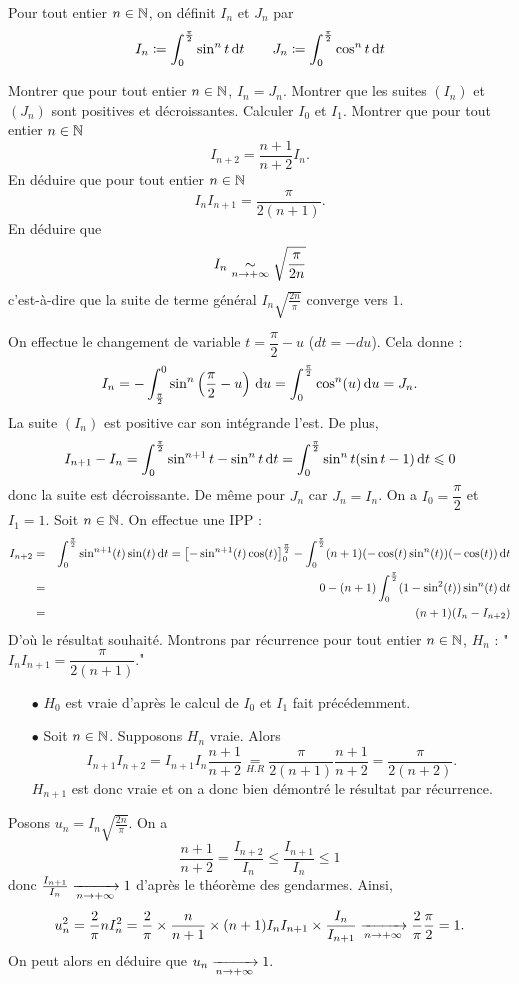 \documentclass{magnolia}
\begin{document}
Pour tout entier $n\in\mathbb{N}$, on définit $I_n$ et $J_n$ par
\[I_n\coloneqq\int_{0}^{\frac{\pi}{2}} \sin^n t\,\text{d}t \qquad
  J_n\coloneqq\int_{0}^{\frac{\pi}{2}} \cos^n t\,\text{d}t\]
\begin{questions}
\question Montrer que pour tout entier $n\in\mathbb{N}$, $I_n=J_n$.
\question Montrer que les suites $(I_n)$ et $(J_n)$ sont positives et
  décroissantes. Calculer $I_0$ et $I_1$.
\question Montrer que pour tout entier $n\in\mathbb{N}$
  \[I_{n+2}=\frac{n+1}{n+2}I_n.\]
\question En déduire que pour tout entier $n\in\mathbb{N}$
  \[I_n I_{n+1}=\frac{\pi}{2(n+1)}.\]
\question En déduire que
  \[I_n\underset{n\rightarrow+\infty}{\sim}\sqrt{\frac{\pi}{2n}}\]
  c'est-à-dire que la suite de terme général $I_n\sqrt{\frac{2n}{\pi}}$
  converge vers $1$.
\end{questions}
\begin{sol}
\begin{questions}
\question On effectue le changement de variable $t=\dfrac{\pi}{2}-u$ ($dt=-du$). Cela donne :
$$I_n=-\int_{\frac{\pi}{2}}^{0} \sin^n \left(\dfrac{\pi}{2}-u\right)\,\text{d}u=\int_{0}^{\frac{\pi}{2}} \cos^n (u)\,\text{d}u=J_n.$$
\question La suite $(I_n)$ est positive car son intégrande l'est. De plus,
$$I_{n+1}-I_n=\int_{0}^{\frac{\pi}{2}} \sin^{n+1} t-\sin^n t\,\text{d}t=\int_{0}^{\frac{\pi}{2}} \sin^{n} t(\sin t-1)\,\text{d}t\leqslant 0$$ donc la suite est décroissante. De même pour $J_n$ car $J_n=I_n$.
 On a $I_0=\dfrac{\pi}{2}$ et $I_1=1$.
\question Soit $n\in\mathbb{N}$. On effectue une IPP :
\begin{eqnarray*}
I_{n+2}&=&\int_{0}^{\frac{\pi}{2}} \sin^{n+1} (t)\sin (t)\,\text{d}t=\left[-\sin^{n+1} (t) \cos (t)\right]_0^{\frac{\pi}{2}}-\int_{0}^{\frac{\pi}{2}} (n+1)(-\cos (t) \sin^n (t))(-\cos(t))\,\text{d}t\\
&=&0-(n+1)\int_{0}^{\frac{\pi}{2}} (1-\sin^2(t))\sin^n(t)\,\text{d}t\\
&=&(n+1)(I_n-I_{n+2})
\end{eqnarray*}
D'où le résultat souhaité.
\question Montrons par récurrence pour tout entier $n\in\mathbb{N}$, $H_n$ : "$I_n I_{n+1}=\dfrac{\pi}{2(n+1)}.$"
\begin{itemize}
\item [$\bullet$] $H_0$ est vraie d'après le calcul de $I_0$ et $I_1$ fait précédemment.
\item [$\bullet$] Soit $n\in \mathbb{N}$. Supposons $H_n$ vraie. Alors $$I_{n+1}I_{n+2}=I_{n+1}I_n\frac{n+1}{n+2}\underset{H.R}{=}\frac{\pi}{2(n+1)}\frac{n+1}{n+2}=\frac{\pi}{2(n+2)}.$$ $H_{n+1}$ est donc vraie et on a donc bien démontré le résultat par récurrence.
\end{itemize}
\question Posons $u_n=I_n\sqrt{\frac{2n}{\pi}}$. On a
$$\frac{n+1}{n+2}=\frac{I_{n+2}}{I_n}\leq \frac{I_{n+1}}{I_n}\leq 1 $$ donc $\frac{I_{n+1}}{I_n} \xrightarrow[n\rightarrow +\infty]{}{1}$ d'après le théorème des gendarmes.
Ainsi, $$u_n^2=\frac{2}{\pi}n I_n^2=\frac{2}{\pi}\times\frac{n}{n+1}\times (n+1)I_n I_{n+1}\times \frac{I_n}{I_{n+1}}\xrightarrow[n\rightarrow +\infty]{}{\frac{2}{\pi}\frac{\pi}{2}}=1.$$
On peut alors en déduire que $u_n \xrightarrow[n\rightarrow +\infty]{}{1}.$
\end{questions}
\end{sol}
\end{document}
